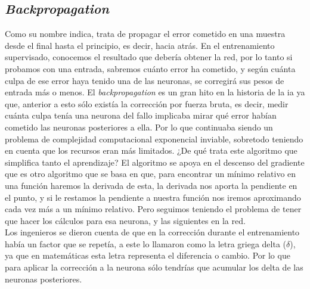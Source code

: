 \subsection{\textit{Backpropagation}}
\label{marco teorico backpropagation}
Como su nombre indica, trata de propagar el error cometido en una muestra desde el final hasta el principio, es decir, hacia atrás. En el entrenamiento supervisado, conocemos el resultado que debería obtener la red, por lo tanto si probamos con una entrada, sabremos cuánto error ha cometido, y según cuánta culpa de ese error haya tenido una de las neuronas, se corregirá sus pesos de entrada más o menos.
El \textit{backpropagation} es un gran hito en la historia de la \gls{ia} ya que, anterior a esto sólo existía la corrección por fuerza bruta, es decir, medir cuánta culpa tenía una neurona del fallo implicaba mirar qué error habían cometido las neuronas posteriores a ella. Por lo que continuaba siendo un problema de complejidad computacional exponencial inviable, sobretodo teniendo en cuenta que los recursos eran más limitados.
¿De qué trata este algoritmo que simplifica tanto el aprendizaje? El algoritmo se apoya en el descenso del gradiente que es otro algoritmo que se basa en que, para encontrar un mínimo relativo en una función haremos la derivada de esta, la derivada nos aporta la pendiente en el punto, y si le restamos la pendiente a nuestra función nos iremos aproximando cada vez más a un mínimo relativo. Pero seguimos teniendo el problema de tener que hacer los cálculos para esa neurona, y las siguientes en la red.
\\
Los ingenieros se dieron cuenta de que en la corrección durante el entrenamiento había un factor que se repetía, a este lo llamaron como la letra griega delta ($\delta$), ya que en matemáticas esta letra representa el diferencia o cambio. Por lo que para aplicar la corrección a la neurona sólo tendrías que acumular los delta de las neuronas posteriores. 

